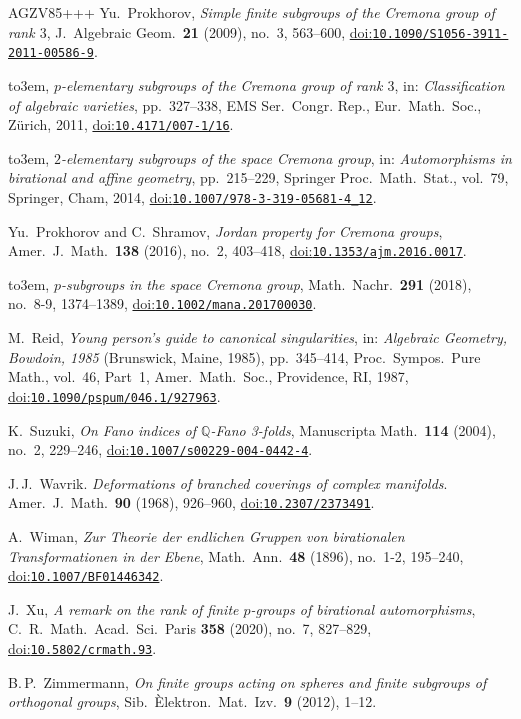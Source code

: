 \documentclass[10pt,a4paper]{article}
\newcommand{\doi}[1]{\href{https://doi.org/#1}{doi:\nolinkurl{#1}}}
\providecommand{\bysame}{\leavevmode\hbox to3em{\hrulefill}\thinspace}
\theoremstyle{definition}
\theoremstyle{remark}
\begin{document}
\begin{thebibliography}{AGZV85+++}
Yu.~Prokhorov, 
 {\em Simple finite subgroups of the Cremona group of rank $3$}, 
 J.~Algebraic Geom.\ \textbf{21} (2009), no.~3, 563--600,
 \doi{10.1090/S1056-3911-2011-00586-9}.

\bysame, 
{\em {$p$}-elementary subgroups of the {C}remona group of rank $3$}, 
in: {\em Classification of algebraic varieties}, pp.~327--338,
EMS Ser.\ Congr. Rep., Eur.\ Math.\ Soc., Z\"urich, 2011,
\doi{10.4171/007-1/16}.

\bysame, 
 {\em $2$-elementary subgroups of the space {C}remona group},
 in: {\em Automorphisms in birational and affine geometry}, pp.~215--229, 
 Springer Proc.\ Math.\ Stat., vol.~79, Springer, Cham, 2014,
 \doi{10.1007/978-3-319-05681-4_12}.

Yu.~Prokhorov and C.~Shramov, 
 {\em Jordan property for Cremona groups},
 Amer.\ J.~Math.\ \textbf{138} (2016), no.~2, 403--418,
 \doi{10.1353/ajm.2016.0017}.

\bysame, 
 {\em $p$-subgroups in the space Cremona group},
 Math.\ Nachr.\ \textbf{291} (2018), no.~8-9, 1374--1389, 
 \doi{10.1002/mana.201700030}.

M.~Reid, 
{\em Young person's guide to canonical singularities},
in: \emph{Algebraic  Geometry, {B}owdoin, 1985} ({B}runswick, {M}aine, 1985), pp.~345--414, Proc.\ Sympos.\ Pure  Math., vol.~46, Part~1, Amer.\ Math.\ Soc., Providence, RI, 1987, \doi{10.1090/pspum/046.1/927963}.

K.~Suzuki, 
 {\em On Fano indices of $\mathbb Q$-Fano 3-folds},
 Manuscripta Math.\ \textbf{114} (2004), no.~2, 229--246,
 \doi{10.1007/s00229-004-0442-4}. 

J.\,J.~Wavrik.
 {\em Deformations of branched coverings of complex manifolds}.
 Amer.~J.\ Math.\ \textbf{90} (1968), 926--960,
 \doi{10.2307/2373491}.

A.~Wiman, 
 {\em Zur Theorie der endlichen Gruppen von birationalen Transformationen in der Ebene}, 
 Math.\ Ann.\ \textbf{48} (1896), no.~1-2, 195--240,
 \doi{10.1007/BF01446342}.

J.~Xu, 
 {\em A remark on the rank of finite $p$-groups of birational
automorphisms}, 
 C.\ R.\ Math.\ Acad.\ Sci.\ Paris \textbf{358} (2020), no.~7, 827--829,
 \doi{10.5802/crmath.93}. 

B.\,P.~Zimmermann, 
 {\em On finite groups acting on spheres and finite subgroups of orthogonal groups}, 
 Sib.\ \`Elektron.\ Mat.\ Izv.\ \textbf{9} (2012), 1--12.

\end{thebibliography}
\end{document}
